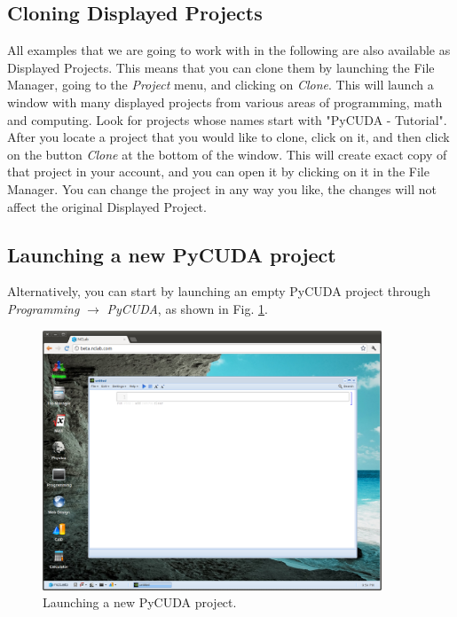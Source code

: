 \documentclass{article}
\begin{document}
\subsection{Cloning Displayed Projects}

All examples that we are going to work with in the following are also available 
as Displayed Projects. This means that you can clone them by launching the File
Manager, going to the {\em Project} menu, and clicking on {\em Clone}. This will launch 
a window with many displayed projects from various areas of programming,
math and computing. Look for projects whose names start with "PyCUDA - Tutorial".
After you locate a project that you would like to clone, click on it,
and then click on the button {\em Clone} at the bottom of the window. This will
create exact copy of that project in your account, and you can open it 
by clicking on it in the File Manager. You can change the project in any way 
you like, the changes will not affect the original Displayed Project. 


\subsection{Launching a new PyCUDA project}

Alternatively, you can start by launching an empty PyCUDA project through 
{\em Programming} $\rightarrow$ {\em PyCUDA}, as shown in Fig. \ref{fig:pycuda}.

\newpage


\begin{figure}[!ht]
\begin{center}
\includegraphics[width=0.9\textwidth]{img/pycuda.png}
\end{center}
\caption{Launching a new PyCUDA project.}
\label{fig:pycuda}
\end{figure}
\noindent
\end{document}
